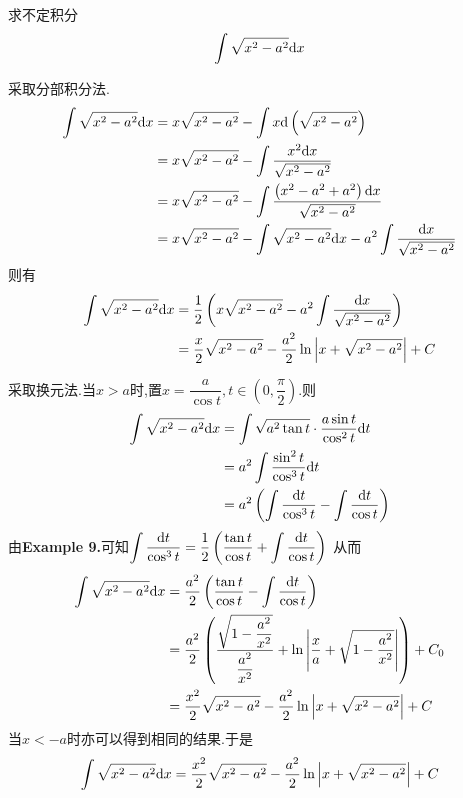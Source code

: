 \documentclass{ctexart}
\begin{document}
\begin{problem}[Example 11.]
    求不定积分$$\int{\sqrt{x^2-a^2}\mathrm{d}x}$$
\end{problem}
\begin{solution}
    采取分部积分法.
    $$\begin{aligned}
        \int{\sqrt{x^2-a^2}\mathrm{d}x} 
        &= x\sqrt{x^2-a^2}-\int{x\mathrm{d}\left(\sqrt{x^2-a^2}\right)} \\
        &= x\sqrt{x^2-a^2}-\int{\dfrac{x^2\mathrm{d}x}{\sqrt{x^2-a^2}}} \\
        &= x\sqrt{x^2-a^2}-\int{\dfrac{\left(x^2-a^2+a^2\right)\mathrm{d}x}{\sqrt{x^2-a^2}}} \\
        &= x\sqrt{x^2-a^2}-\int{\sqrt{x^2-a^2}\mathrm{d}x}-a^2\int{\dfrac{\mathrm{d}x}{\sqrt{x^2-a^2}}}
    \end{aligned}$$
    则有
    $$\begin{aligned}
        \int{\sqrt{x^2-a^2}\mathrm{d}x} 
        &= \dfrac{1}{2}\left( x\sqrt{x^2-a^2}-a^2\int{\dfrac{\mathrm{d}x}{\sqrt{x^2-a^2}}}\right) \\
        &= \dfrac{x}{2}\sqrt{x^2-a^2}-\dfrac{a^2}{2}\ln\left\lvert x+\sqrt{x^2-a^2}\right\rvert+C
    \end{aligned}$$
\end{solution}
\begin{solution}
    采取换元法.当$x>a$时,置$x=\dfrac{a}{\cos t},t\in\left(0,\dfrac{\pi}{2}\right)$.则
    $$\begin{aligned}
        \int{\sqrt{x^2-a^2}\mathrm{d}x}
        &= \int{\sqrt{a^2\tan t}\cdot\dfrac{a\sin t}{\cos^2t}\mathrm{d}t} \\
        &= a^2\int{\dfrac{\sin^2t}{\cos^3t}\mathrm{d}t} \\
        &= a^2\left(\int{\dfrac{\mathrm{d}t}{\cos^3t}}-\int{\dfrac{\mathrm{d}t}{\cos t}}\right)
    \end{aligned}$$
    由\textbf{Example 9.}可知$\displaystyle\int{\dfrac{\mathrm{d}t}{\cos^3t}}=\dfrac{1}{2}\left(\dfrac{\tan t}{\cos t}+\int{\dfrac{\mathrm{d}t}{\cos t}}\right)$
    从而
    $$\begin{aligned}
        \int{\sqrt{x^2-a^2}\mathrm{d}x}
        &= \dfrac{a^2}{2}\left(\dfrac{\tan t}{\cos t}-\int{\dfrac{\mathrm{d}t}{\cos t}}\right) \\
        &= \dfrac{a^2}{2}\left(\dfrac{\sqrt{1-\dfrac{a^2}{x^2}}}{\dfrac{a^2}{x^2}}+\ln{\left|\dfrac{x}{a}+\sqrt{1-\dfrac{a^2}{x^2}}\right|}\right)+C_0 \\
        &= \dfrac{x^2}{2}\sqrt{x^2-a^2}-\dfrac{a^2}{2}\ln{\left|x+\sqrt{x^2-a^2}\right|}+C
    \end{aligned}$$
    当$x<-a$时亦可以得到相同的结果.于是
    $$\int{\sqrt{x^2-a^2}\mathrm{d}x}=\dfrac{x^2}{2}\sqrt{x^2-a^2}-\dfrac{a^2}{2}\ln{\left|x+\sqrt{x^2-a^2}\right|}+C$$
\end{solution}
\end{document}
